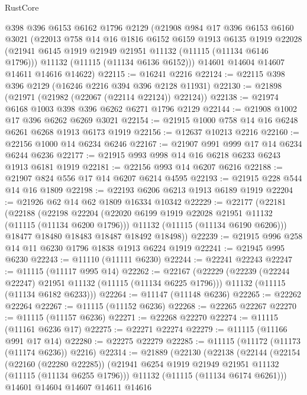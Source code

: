 \begin{lexlean}{RustCore}
\begin{coremodule}
    @398
    @396
    @6153
    @6162
    @1796
    @2129
    (@21908
      @984
      @17
      @396
      @6153
      @6160
      @3021
      (@22013
        @758
        @14
        @16
        @1816
        @6152
        @6159
        @1913
        @6135
        @1919
        @22028
        (@21941 @6145 @1919 @21949 @21951 @11132 (@11115 (@11134 @6146 @1796)))
        @11132
        (@11115 (@11134 @6136 @6152)))
      @14601
      @14604
      @14607
      @14611
      @14616
      @14622)
@22115 := @16241 @2216
@22124 := @22115 @398 @396 @2129 (@16246 @2216 @394 @396 @2128 @11931)
@22130 := @21898 (@21971 (@21982 (@22067 (@22114 @22124)) @22124))
@22138 := @21974 @6168 @1003 @398 @396 @6262 @6271 @1796 @2129
@22144 := @21908 @1002 @17 @396 @6262 @6269 @3021
@22154 := @21915 @1000 @758 @14 @16 @6248 @6261 @6268 @1913 @6173 @1919
@22156 := @12637 @10213 @2216
@22160 := @22156 @1000 @14 @6234 @6246
@22167 := @21907 @991 @999 @17 @14 @6234 @6244 @6236
@22177 := @21915 @993 @998 @14 @16 @6218 @6233 @6243 @1913 @6181 @1919
@22181 := @22156 @993 @14 @6207 @6216
@22188 := @21907 @824 @556 @17 @14 @6207 @6214 @4595
@22193 := @21915 @228 @544 @14 @16 @1809
@22198 := @22193 @6206 @6213 @1913 @6189 @1919
@22204 := @21926 @62 @14 @62 @1809 @16334 @10342
@22229 := @22177
    (@22181
      (@22188
        (@22198
          @22204
          (@22020 @6199 @1919 @22028 @21951 @11132 (@11115 (@11134 @6200 @1796)))
          @11132
          (@11115 (@11134 @6190 @6206)))
        @18477
        @18480
        @18483
        @18487
        @18492
        @18498))
@22239 := @21915 @996 @258 @14 @11 @6230 @1796 @1838 @1913 @6224 @1919
@22241 := @21945 @995 @6230
@22243 := @11110 (@11111 @6230)
@22244 := @22241 @22243
@22247 := @11115 (@11117 @995 @14)
@22262 := @22167
    (@22229
      (@22239 (@22244 @22247) @21951 @11132 (@11115 (@11134 @6225 @1796)))
      @11132
      (@11115 (@11134 @6182 @6233)))
@22264 := @11147 (@11148 @6236)
@22265 := @22262 @22264
@22267 := @11115 (@11152 @6236)
@22268 := @22265 @22267
@22270 := @11115 (@11157 @6236)
@22271 := @22268 @22270
@22274 := @11115 (@11161 @6236 @17)
@22275 := @22271 @22274
@22279 := @11115 (@11166 @991 @17 @14)
@22280 := @22275 @22279
@22285 := @11115 (@11172 (@11173 (@11174 @6236)) @2216)
@22314 := @21889
    (@22130
      (@22138
        (@22144
          (@22154
            (@22160 (@22280 @22285))
            (@21941 @6254 @1919 @21949 @21951 @11132 (@11115 (@11134 @6255 @1796)))
            @11132
            (@11115 (@11134 @6174 @6261)))
          @14601
          @14604
          @14607
          @14611
          @14616

\end{coremodule}
\end{lexlean}
